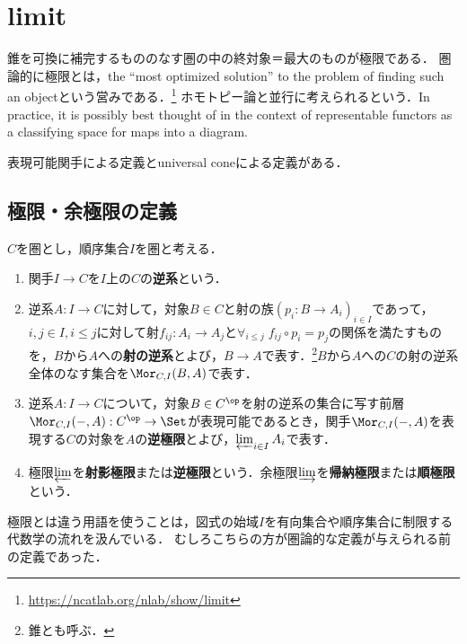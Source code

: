 \documentclass[uplatex,dvipdfmx]{jsreport}
\begin{document}
\section{limit}

\begin{tcolorbox}[colframe=ForestGreen, colback=ForestGreen!10!white, breakable ,colbacktitle=ForestGreen!40!white, coltitle=black,fonttitle=\bfseries\sffamily,
    title=]
    錐を可換に補完するもののなす圏の中の終対象＝最大のものが極限である．
    圏論的に極限とは，the “most optimized solution” to the problem of finding such an objectという営みである．\footnote{\url{https://ncatlab.org/nlab/show/limit}}
    ホモトピー論と並行に考えられるという．In practice, it is possibly best thought of in the context of representable functors as a classifying space for maps into a diagram.

    表現可能関手による定義とuniversal coneによる定義がある．
\end{tcolorbox}

\subsection{極限・余極限の定義}

\begin{definition}
    $C$を圏とし，順序集合$I$を圏と考える．
    \begin{enumerate}
        \item 関手$I\to C$を$I$上の$C$の\textbf{逆系}という．
        \item 逆系$A:I\to C$に対して，対象$B\in C$と射の族$(p_i:B\to A_i)_{i\in I}$であって，$i,j\in I,i\le j$に対して射$f_{ij}:A_i\to A_j$と$\forall_{i\le j}\;f_{ij}\circ p_i=p_j$の関係を満たすものを，$B$から$A$への\textbf{射の逆系}とよび，$B\to A$で表す．\footnote{錐とも呼ぶ．}$B$から$A$への$C$の射の逆系全体のなす集合を$\Mor_{C,I}(B,A)$で表す．
        \item 逆系$A:I\to C$について，対象$B\in C^\op$を射の逆系の集合に写す前層$\Mor_{C,I}(-,A):C^\op\to\Set$が表現可能であるとき，関手$\Mor_{C,I}(-,A)$を表現する$C$の対象を$A$の\textbf{逆極限}とよび，$\varprojlim_{i\in I}A_i$で表す．
        \item 極限$\varprojlim$を\textbf{射影極限}または\textbf{逆極限}という．余極限$\varinjlim$を\textbf{帰納極限}または\textbf{順極限}という．
    \end{enumerate}
\end{definition}
\begin{remark}
    極限とは違う用語を使うことは，図式の始域$I$を有向集合や順序集合に制限する代数学の流れを汲んでいる．
    むしろこちらの方が圏論的な定義が与えられる前の定義であった．
\end{remark}
\end{document}
